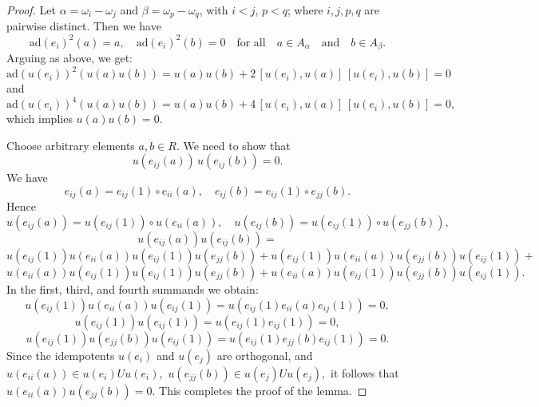 \documentclass[10pt,a4paper]{amsart}
\begin{document}
\begin{proof}
Let $\alpha = \omega_i - \omega_j$ and $\beta = \omega_p - \omega_q$, with $i < j$, $p < q$; where $i,j,p,q$ are pairwise distinct. Then we have
\[
\text{ad}(e_i)^2 (a) = a, \quad \text{ad}(e_i)^2 (b) = 0 \quad \text{for all} \quad a\in A_{\alpha} \quad \text{and} \quad b\in A_{\beta}. 
\] 
Arguing as above, we get:
\[
\text{ad}(u(e_i))^2 \left( u(a) u(b) \right) = u(a) u(b) + 2\, [u(e_i), u(a)] \, [ u(e_i) , u(b) ]  = 0
\]
and
\[
\text{ad}(u(e_i))^4 \left( u(a) u(b) \right) = u(a) u(b) + 4\, [u(e_i), u(a)] \, [ u(e_i) , u(b) ]  = 0,
\]
which implies $u(a) u(b) = 0$.


Choose arbitrary elements $a, b \in R$. We need to show that 
\[
u(e_{ij}(a)) \, u(e_{ij}(b)) = 0.
\]
We have 
\[
e_{ij}(a) = e_{ij}(1) \circ e_{ii}(a), 
\quad e_{ij}(b) = e_{ij}(1) \circ e_{jj}(b).
\]
Hence
\[
u(e_{ij}(a)) = u(e_{ij}(1)) \circ u(e_{ii}(a)), 
\quad u(e_{ij}(b)) = u(e_{ij}(1)) \circ u(e_{jj}(b)),
\]
\[	u(e_{ij}(a)) u(e_{ij}(b)) 
	= \]
	\[ u(e_{ij}(1)) u(e_{ii}(a)) u(e_{ij}(1)) u(e_{jj}(b)) + u(e_{ij}(1)) u(e_{ii}(a))  u(e_{jj}(b)) u(e_{ij}(1)) 
 +  \]
 \[ u(e_{ii}(a)) u(e_{ij}(1)) u(e_{ij}(1))  u(e_{jj}(b)) +  u(e_{ii}(a)) u(e_{ij}(1)) u(e_{jj}(b)) u(e_{ij}(1)).
\]
In the first, third, and fourth summands we obtain:
\[
u(e_{ij}(1)) u(e_{ii}(a)) u(e_{ij}(1)) = 
u\!\left( e_{ij}(1) e_{ii}(a) e_{ij}(1) \right) = 0,
\]
\[
u(e_{ij}(1)) u(e_{ij}(1)) = 
u\!\left( e_{ij}(1) e_{ij}(1) \right) = 0,
\]
\[
u(e_{ij}(1)) u(e_{jj}(b)) u(e_{ij}(1)) = 
u\!\left( e_{ij}(1) e_{jj}(b) e_{ij}(1) \right) = 0.
\]
Since the idempotents  $u(e_i)$ and $u(e_j)$ are orthogonal, and $u(e_{ii}(a))\in u(e_i)U u(e_i),$ $u(e_{jj}(b))\in u(e_j)U u(e_j),$ it follows that $u(e_{ii}(a)) u(e_{jj}(b))=0.$ This completes the proof of the lemma. \end{proof}
\end{document}
